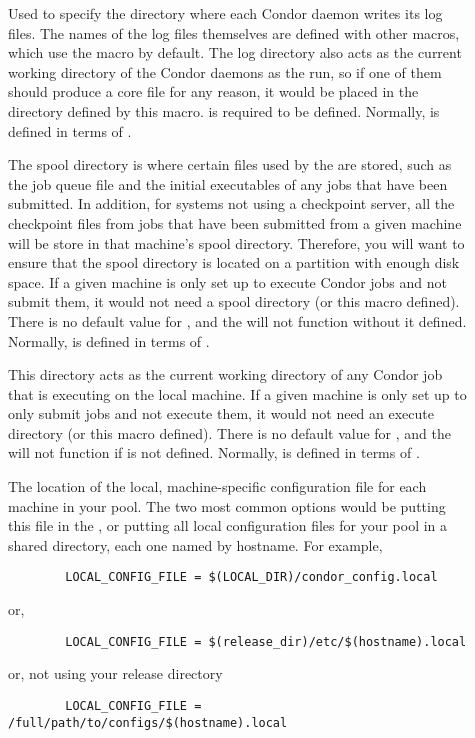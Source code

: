 \begin{description}
\item[] \label{param:Log} Used to specify the
  directory where each Condor daemon writes its log files.  The names
  of the log files themselves are defined with other macros, which use
  the  macro by default.  The log directory also acts as
  the current working directory of the Condor daemons as the run, so
  if one of them should produce a core file for any reason, it would
  be placed in the directory defined by this macro.   is
  required to be defined.  Normally,  is defined in
  terms of .
  
\item[] \label{param:Spool} The spool directory is where
  certain files used by the  are stored, such as the
  job queue file and the initial executables of any jobs that have
  been submitted.  In addition, for systems not using a checkpoint
  server, all the checkpoint files from jobs that have been submitted
  from a given machine will be store in that machine's spool
  directory.  Therefore, you will want to ensure that the spool
  directory is located on a partition with enough disk space.  If a
  given machine is only set up to execute Condor jobs and not submit
  them, it would not need a spool directory (or this macro defined).
  There is no default value for , and the 
  will not function without it  defined.  Normally,
   is defined in terms of .
  
\item[] \label{param:Execute} This directory acts as
  the current working directory of any Condor job that is executing on
  the local machine.  If a given machine is only set up to only submit
  jobs and not execute them, it would not need an execute directory
  (or this macro defined).  There is no default value for
  , and the  will not function if
   is not defined.  Normally,  is
  defined in terms of .
  
\item[] \label{param:LocalConfigFile} The
  location of the local, machine-specific configuration
  file for each machine
  in your pool.  The two most common options would be putting this
  file in the , or putting all
  local configuration files for your pool in a shared directory, each one
  named by hostname.  For example,
\begin{verbatim}
        LOCAL_CONFIG_FILE = $(LOCAL_DIR)/condor_config.local
\end{verbatim}
  or,
\begin{verbatim}
        LOCAL_CONFIG_FILE = $(release_dir)/etc/$(hostname).local
\end{verbatim}
  or, not using your release directory
\begin{verbatim}
        LOCAL_CONFIG_FILE = /full/path/to/configs/$(hostname).local
\end{verbatim}
  

\end{description}
